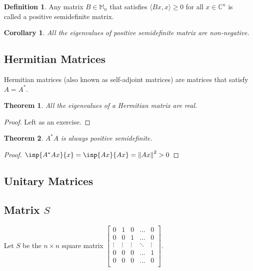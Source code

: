 \documentclass[twofold]{article}
\newcommand*\adj[1]{#1^*}
\newcommand*\norm[1]{\left \Vert #1 \right\Vert}
\theoremstyle{plain}
\newtheorem*{theorem}{Theorem}
\newtheorem*{corollary}{Corollary}
\theoremstyle{definition}
\newtheorem*{definition}{Definition}
\begin{document}
\begin{definition} Any matrix \(B \in \mathbb{M}_n\) that satisfies \(\langle Bx, x\rangle \ge 0\) for all \(x \in \mathbb{C}^n\) is called a positive semidefinite matrix. \end{definition}

\begin{corollary}All the eigenvalues of positive semidefinite matrix are non-negative. \end{corollary}


\subsection{Hermitian Matrices}
Hermitian matrices (also known as self-adjoint matrices) are matrices that satisfy \(A = \adj{A}\). 

\begin{theorem} All the eigenvalues of a Hermitian matrix are real. \end{theorem}

\begin{proof}Left as an exercise. \end{proof}




\begin{theorem} \(\adj{A} A\) is always positive semidefinite. \end{theorem}

\begin{proof} \(\inp{\adj{A} A x}{ x} = \inp{Ax}{Ax} = \norm{Ax}^2 > 0\)\end{proof}




\subsection{Unitary Matrices}


\subsection{Matrix \(S\)}
Let \(S\) be the \(n \times n\) square matrix \( \begin{bmatrix} 
0 & 1 & 0 & \ldots & 0 \\
0 & 0 & 1 & \ldots & 0 \\
\vdots & \vdots & \vdots &\ddots & \vdots \\
0 & 0 & 0 &\ldots & 1 \\
0 & 0 & 0 & \ldots & 0 \\ 
\end{bmatrix}\). 
\end{document}
